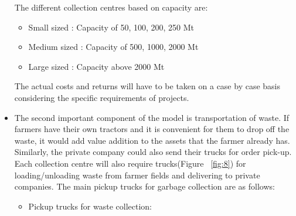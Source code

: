 \documentclass[conference]{IEEEtran}
\begin{document}
\begin{itemize}
 The different collection centres based on capacity are: 
\begin{itemize}
    \item Small sized  : Capacity of 50, 100, 200, 250 Mt
    \item Medium sized : Capacity of 500, 1000, 2000 Mt
    \item Large sized : Capacity above 2000 Mt
\end{itemize}
The actual costs and returns will have to be taken on a case by case basis considering the specific requirements of projects. 
\item The second important component of the model is transportation of waste. If farmers have their own tractors and it is convenient for them to drop off the waste, it would add value addition to the assets that the farmer already has. Similarly, the private company could also send their trucks for order pick-up. \\
Each collection centre will also require trucks(Figure ~\ref{fig:8}) for loading/unloading waste from farmer fields and delivering to private companies. The main pickup trucks for garbage collection are as follows: 
\begin{itemize}
    \item Pickup trucks for waste collection: 
    \begin{itemize}


\end{itemize}
\end{itemize}
\end{itemize}
\end{document}
